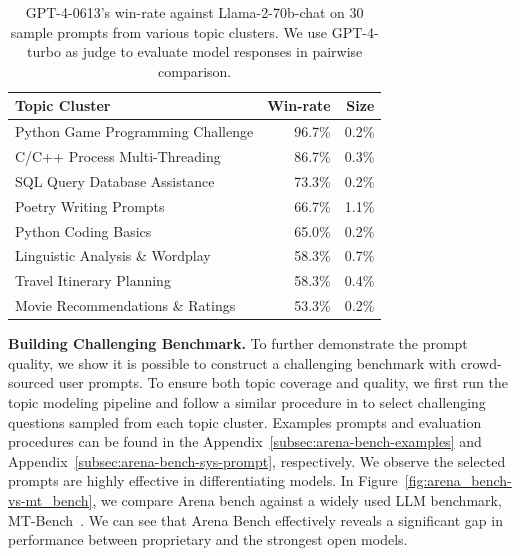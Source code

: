 \documentclass{article}
\newcommand{\system}{Chatbot Arena\xspace}
\begin{document}
\begin{table}[t!]
\centering
\vspace{-1em}
\caption{GPT-4-0613's win-rate against Llama-2-70b-chat on 30 sample prompts from various topic clusters. We use GPT-4-turbo as judge to evaluate model responses in pairwise comparison.}
\label{table:challenging-clusters}
\footnotesize
{\small
\begin{tabular}{lrr}
\toprule
Topic Cluster & Win-rate & Size\\
\midrule
Python Game Programming Challenge   & 96.7\% & 0.2\%\\
C/C++ Process Multi-Threading       & 86.7\% & 0.3\% \\
SQL Query Database Assistance       & 73.3\% & 0.2\%\\
Poetry Writing Prompts              & 66.7\% & 1.1\%\\
Python Coding Basics                & 65.0\% & 0.2\%\\
Linguistic Analysis \& Wordplay     & 58.3\% & 0.7\%\\
Travel Itinerary Planning           & 58.3\% & 0.4\% \\
Movie Recommendations \& Ratings    & 53.3\% & 0.2\% \\
\bottomrule
\end{tabular}}
\vspace{-5px}
\end{table}


\textbf{Building Challenging Benchmark.} To further demonstrate the prompt quality, we show it is possible to construct a challenging benchmark with crowd-sourced user prompts.
To ensure both topic coverage and quality, we first run the topic modeling pipeline and follow a similar procedure in \citet{zheng2023lmsyschat1m} to select challenging questions sampled from each topic cluster.
Examples prompts and evaluation procedures can be found in the Appendix~\ref{subsec:arena-bench-examples} and Appendix~\ref{subsec:arena-bench-sys-prompt}, respectively.
We observe the selected prompts are highly effective in differentiating models. In Figure~\ref{fig:arena_bench-vs-mt_bench}, we compare Arena bench against a widely used LLM benchmark, MT-Bench~\cite{zheng2023judging}.
We can see that Arena Bench effectively reveals a significant gap in performance between proprietary and the strongest open models.
\end{document}
